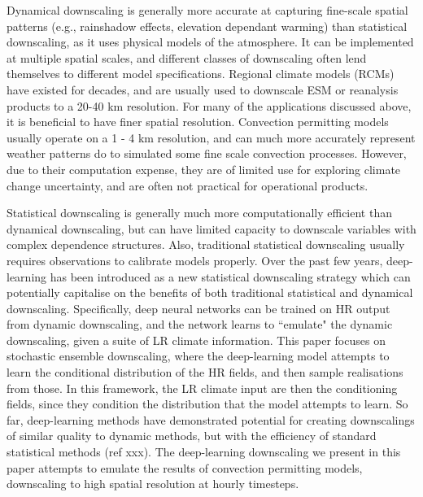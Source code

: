 \documentclass{ametsocV6.1}
\begin{document}
Dynamical downscaling is generally more accurate at capturing fine-scale spatial patterns (e.g., rainshadow effects, elevation dependant warming) than statistical downscaling, as it uses physical models of the atmosphere. It can be implemented at multiple spatial scales, and different classes of downscaling often lend themselves to different model specifications. Regional climate models (RCMs) have existed for decades, and are usually used to downscale ESM or reanalysis products to a 20-40 km resolution. For many of the applications discussed above, it is beneficial to have finer spatial resolution. Convection permitting models usually operate on a 1 - 4 km resolution, and can much more accurately represent weather patterns do to simulated some fine scale convection processes. However, due to their computation expense, they are of limited use for exploring climate change uncertainty, and are often not practical for operational products.

Statistical downscaling is generally much more computationally efficient than dynamical downscaling, but can have limited capacity to downscale variables with complex dependence structures. Also, traditional statistical downscaling usually requires observations to calibrate models properly. Over the past few years, deep-learning has been introduced as a new statistical downscaling strategy which can potentially capitalise on the benefits of both traditional statistical and dynamical downscaling. Specifically, deep neural networks can be trained on HR output from dynamic downscaling, and the network learns to ``emulate" the dynamic downscaling, given a suite of LR climate information. This paper focuses on stochastic ensemble downscaling, where the deep-learning model attempts to learn the conditional distribution of the HR fields, and then sample realisations from those. In this framework, the LR climate input are then the conditioning fields, since they condition the distribution that the model attempts to learn. So far, deep-learning methods have demonstrated potential for creating downscalings of similar quality to dynamic methods, but with the efficiency of standard statistical methods (ref xxx). The deep-learning downscaling we present in this paper attempts to emulate the results of convection permitting models, downscaling to high spatial resolution at hourly timesteps. 
\end{document}
